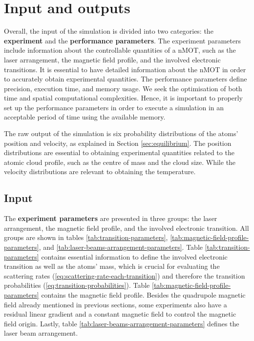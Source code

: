 %
\section{Input and outputs}
\label{sec:input-outputs}
%

Overall, the input of the simulation is divided into two categories: the \textbf{experiment} and the \textbf{performance parameters}. The experiment parameters include information about the controllable quantities of a nMOT, such as the laser arrangement, the magnetic field profile, and the involved electronic transitions. It is essential to have detailed information about the nMOT in order to accurately obtain experimental quantities. The performance parameters define precision, execution time, and memory usage. We seek the optimisation of both time and spatial computational complexities. Hence, it is important to properly set up the performance parameters in order to execute a simulation in an acceptable period of time using the available memory.

The raw output of the simulation is six probability distributions of the atoms' position and velocity, as explained in Section \ref{sec:equilibrium}. The position distributions are essential to obtaining experimental quantities related to the atomic cloud profile, such as the centre of mass and the cloud size. While the velocity distributions are relevant to obtaining the temperature.

\subsection{Input}
\label{sec:input}

The \textbf{experiment parameters} are presented in three groups: the laser arrangement, the magnetic field profile, and the involved electronic transition. All groups are shown in tables \ref{tab:transition-parameters}, \ref{tab:magnetic-field-profile-parameters}, and \ref{tab:laser-beams-arrangement-parameters}. Table \ref{tab:transition-parameters} contains essential information to define the involved electronic transition as well as the atoms' mass, which is crucial for evaluating the scattering rates (\ref{eq:scattering-rate-each-transition}) and therefore the transition probabilities (\ref{eq:transition-probabilities}).
Table \ref{tab:magnetic-field-profile-parameters} contains the magnetic field profile. Besides the quadrupole magnetic field already mentioned in previous sections, some experiments also have a residual linear gradient and a constant magnetic field to control the magnetic field origin. Lastly, table \ref{tab:laser-beams-arrangement-parameters} defines the laser beam arrangement.

